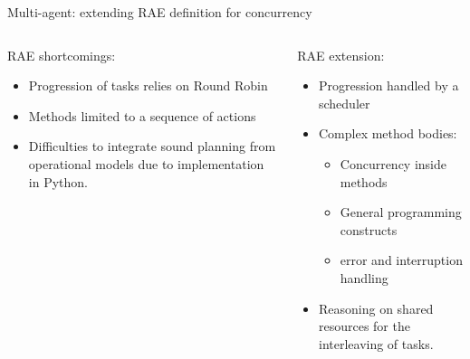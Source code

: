 \begin{frame}{Multi-agent: extending RAE definition for concurrency}
    \begin{columns}
        \begin{column}{0.5\textwidth}
            RAE shortcomings:
            \begin{itemize}
                \item Progression of tasks relies on Round Robin
                \item Methods limited to a sequence of actions
                \item Difficulties to integrate sound planning from operational models due to implementation in Python.
            \end{itemize}
        \end{column}
        \begin{column}{0.5\textwidth}
            RAE extension:
            \begin{itemize}
                \item Progression handled by a scheduler
                \item Complex method bodies:
                \begin{itemize}
                    \item Concurrency inside methods
                    \item General programming constructs
                    \item error and interruption handling
                \end{itemize}
                \item Reasoning on shared resources for the interleaving of tasks.
            \end{itemize}
        \end{column}
    \end{columns}
\end{frame}

